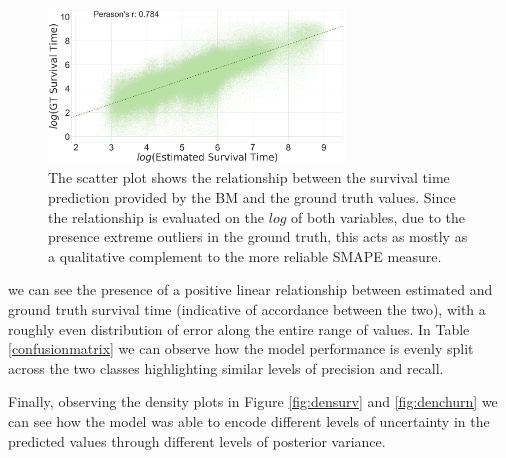 \begin{figure}[h]
  \centering
  \includegraphics[width=0.7\textwidth]{images/chapter_3/performance_survival_31.pdf}
  \caption[\textbf{Performance of the BM on survival task}]{The scatter plot shows the relationship between the survival time prediction provided by the BM and the ground truth values. Since the relationship is evaluated on the $log$ of both variables, due to the presence extreme outliers in the ground truth, this acts as mostly as a qualitative complement to the more reliable SMAPE measure.}
  \label{perfsurv}
\end{figure}

we can see the presence of a positive linear relationship between estimated and ground truth survival time (indicative of accordance between the two), with a roughly even distribution of error along the entire range of values. In Table \ref{confusionmatrix}  
we can observe how the model performance is evenly split across the two classes highlighting similar levels of precision and recall. 

Finally, observing the density plots in Figure \ref{fig:densurv} and \ref{fig:denchurn} we can see how the model was able to encode different levels of uncertainty in the predicted values through different levels of posterior variance.

